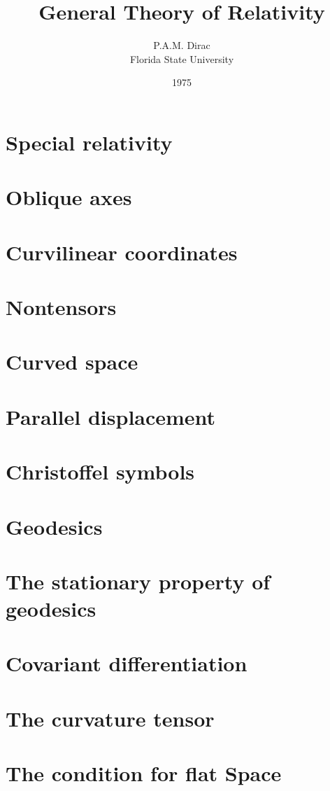 \documentclass[12pt]{article}
\title{General Theory of Relativity}
\author{P.A.M. Dirac\\Florida State University}
\date{1975}
\numberwithin{equation}{section}
\begin{document}
\maketitle
\section{Special relativity}

\section{Oblique axes}

\section{Curvilinear coordinates}

\section{Nontensors}

\section{Curved space}

\section{Parallel displacement}

\section{Christoffel symbols}

\section{Geodesics}

\section{The stationary property of geodesics}

\section{Covariant differentiation}

\section{The curvature tensor}

\section{The condition for flat Space}

\end{document}
